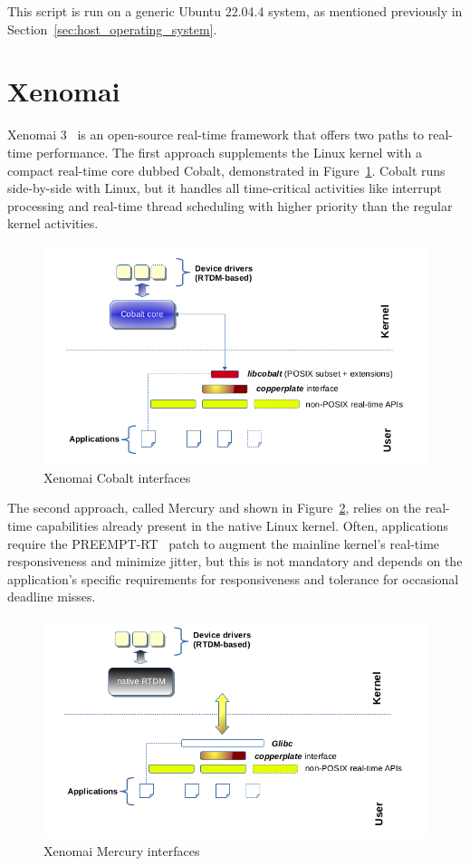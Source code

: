 \documentclass[MMR,Master,english]{twbook}
\begin{document}
\noindent This script is run on a generic Ubuntu 22.04.4 system, as mentioned previously in Section~\ref{sec:host_operating_system}.

\clearpage

\section{Xenomai}\label{sec:xenomai}

Xenomai 3~\cite{XenomaiXenomai} is an open-source real-time framework that offers two paths to real-time performance. The first approach supplements the Linux kernel with a compact real-time core dubbed Cobalt, demonstrated in Figure~\ref{fig:cobalt}. Cobalt runs side-by-side with Linux, but it handles all time-critical activities like interrupt processing and real-time thread scheduling with higher priority than the regular kernel activities.

\begin{figure}[H]
	\centering
	\includegraphics[width=0.6\columnwidth]{img/introduction/xenomai/x3-cobalt-interfaces.png}
	\caption[Xenomai Cobalt interfaces]{Xenomai Cobalt interfaces~\cite{XenomaiXenomai}}
	\label{fig:cobalt}
\end{figure}

\noindent  The second approach, called Mercury and shown in Figure~\ref{fig:mercury}, relies on the real-time capabilities already present in the native Linux kernel. Often, applications require the PREEMPT-RT~\cite{RealtimePreempt_rt_versionsWiki} patch to augment the mainline kernel's real-time responsiveness and minimize jitter, but this is not mandatory and depends on the application's specific requirements for responsiveness and tolerance for occasional deadline misses.

\begin{figure}[H]
	\centering
	\includegraphics[width=0.6\columnwidth]{img/introduction/xenomai/x3-mercury-interfaces.png}
	\caption[Xenomai Mercury interfaces]{Xenomai Mercury interfaces~\cite{XenomaiXenomai}}
	\label{fig:mercury}
\end{figure}
\end{document}

